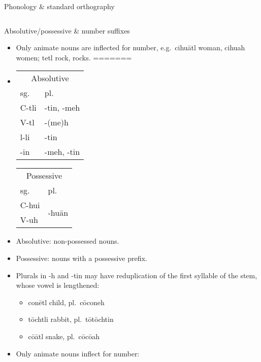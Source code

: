 \documentclass[12pt]{beamer}
\newcommand{\nah}[1]{\textcolor{nahgrn}{#1}}
\newcommand{\trs}[1]{\textcolor{nahblu}{#1}}
\begin{document}
\begin{frame}
\begin{columns}[t]
\begin{column}{.22\linewidth}
\begin{block}{Phonology \& standard orthography}
\begin{threeparttable}
\begin{tablenotes}
\begin{frame}
\begin{columns}[t]
\begin{column}{.23\linewidth}
\begin{block}{Absolutive/possessive \& number suffixes}
\begin{itemize}
        \item Only animate nouns are inflected for number, e.g.~\nah{cihuātl} \trs{woman}, \nah{cihuah} \trs{women}; \nah{tetl} \trs{rock, rocks}. 
=======
          \item
                \begin{tabular}[t]{ll}
                  \multicolumn{2}{c}{Absolutive} \\
                  sg.         & pl.              \\
                  \nah{C-tli} & \nah{-tin, -meh} \\
                  \nah{V-tl}  & \nah{-(me)h}     \\
                  \nah{l-li}  & \nah{-tin}       \\
                  \nah{-in}   & \nah{-meh, -tin} \\
                \end{tabular}%
                \qquad
                \begin{tabular}[t]{ll}
                  \multicolumn{2}{c}{Possessive }                                   \\
                  sg.         & pl.                                                 \\
                  \nah{C-hui} & \multicolumn{1}{l}{\multirow{2}[0]{*}{\nah{-huān}}} \\
                  \nah{V-uh}  &                                                     \\
                \end{tabular}%
          \item Absolutive: non-possessed nouns.
          \item Possessive: nouns with a possessive prefix.
          \item Plurals in \nah{-h} and \nah{-tin} may have reduplication of the first syllable of the stem, whose vowel is lengthened:
                \begin{itemize}
                  \item \nah{conētl} \trs{child}, pl.~\nah{cōconeh}
                  \item \nah{tōchtli} \trs{rabbit}, pl.~\nah{tōtōchtin}
                  \item \nah{cōātl} \trs{snake}, pl.~\nah{cōcōah}
                \end{itemize}
          \item Only animate nouns inflect for number:
                \begin{itemize}

\end{itemize}
\end{itemize}
\end{block}
\end{column}
\end{columns}
\end{frame}
\end{tablenotes}
\end{threeparttable}
\end{block}
\end{column}
\end{columns}
\end{frame}
\end{document}
